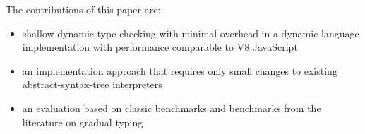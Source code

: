 

The contributions of this paper are:

\begin{itemize}
\item shallow dynamic type checking with minimal overhead
      in a dynamic language implementation
      with performance comparable to V8 JavaScript
\item an implementation approach that requires
      only small changes to existing abstract-syntax-tree interpreters
\item an evaluation based on classic benchmarks
      and benchmarks from the literature on gradual typing
\end{itemize}
